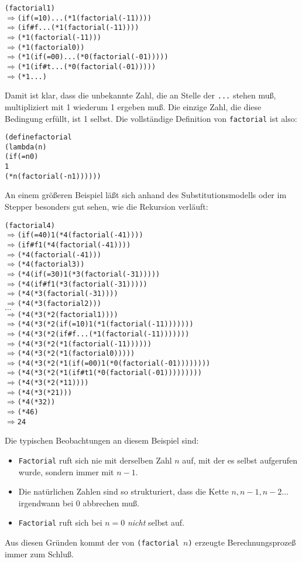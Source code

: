 \begin{alltt}
(factorial 1)
\(\Longrightarrow\) (if (= 1 0) ... (* 1 (factorial (- 1 1))))
\(\Longrightarrow\) (if #f ... (* 1 (factorial (- 1 1))))
\(\Longrightarrow\) (* 1 (factorial (- 1 1)))
\(\Longrightarrow\) (* 1 (factorial 0))
\(\Longrightarrow\) (* 1 (if (= 0 0) ... (* 0 (factorial (- 0 1)))))
\(\Longrightarrow\) (* 1 (if #t ... (* 0 (factorial (- 0 1)))))
\(\Longrightarrow\) (* 1 ...)
\end{alltt}
%
Damit ist klar, dass die unbekannte Zahl, die an Stelle der 
\texttt{...} stehen muß, multipliziert mit 1 wiederum 1 ergeben muß.
Die einzige Zahl, die diese Bedingung erfüllt, ist 1 selbst.  Die
vollständige Definition von \texttt{factorial} ist also:
%
\begin{alltt}
(define factorial
  (lambda (n)
    (if (= n 0)
        1
        (* n (factorial (- n 1))))))
\end{alltt}
%
An einem größeren Beispiel läßt sich anhand des Substitutionsmodells
oder im Stepper besonders gut sehen, wie die Rekursion verläuft:
%
\begin{alltt}
(factorial 4)
\(\Longrightarrow\) (if (= 4 0) 1 (* 4 (factorial (- 4 1))))
\(\Longrightarrow\) (if #f 1 (* 4 (factorial (- 4 1))))
\(\Longrightarrow\) (* 4 (factorial (- 4 1)))
\(\Longrightarrow\) (* 4 (factorial 3))
\(\Longrightarrow\) (* 4 (if (= 3 0) 1 (* 3 (factorial (- 3 1)))))
\(\Longrightarrow\) (* 4 (if #f 1 (* 3 (factorial (- 3 1)))))
\(\Longrightarrow\) (* 4 (* 3 (factorial (- 3 1))))
\(\Longrightarrow\) (* 4 (* 3 (factorial 2)))
\(\ldots\)
\(\Longrightarrow\) (* 4 (* 3 (* 2 (factorial 1))))
\(\Longrightarrow\) (* 4 (* 3 (* 2 (if (= 1 0) 1 (* 1 (factorial (- 1 1)))))))
\(\Longrightarrow\) (* 4 (* 3 (* 2 (if #f ... (* 1 (factorial (- 1 1)))))))
\(\Longrightarrow\) (* 4 (* 3 (* 2 (* 1 (factorial (- 1 1))))))
\(\Longrightarrow\) (* 4 (* 3 (* 2 (* 1 (factorial 0)))))
\(\Longrightarrow\) (* 4 (* 3 (* 2 (* 1 (if (= 0 0) 1 (* 0 (factorial (- 0 1))))))))
\(\Longrightarrow\) (* 4 (* 3 (* 2 (* 1 (if #t 1 (* 0 (factorial (- 0 1)))))))))
\(\Longrightarrow\) (* 4 (* 3 (* 2 (* 1 1))))
\(\Longrightarrow\) (* 4 (* 3 (* 2 1)))
\(\Longrightarrow\) (* 4 (* 3 2))
\(\Longrightarrow\) (* 4 6)
\(\Longrightarrow\) 24
\end{alltt}
%
Die typischen Beobachtungen an diesem Beispiel sind:
%
\begin{itemize}
\item \texttt{Factorial} ruft sich nie mit derselben Zahl $n$ auf, mit
  der es selbst aufgerufen wurde, sondern immer mit $n-1$.
\item Die natürlichen Zahlen sind so strukturiert, dass die Kette $n,
  n-1, n-2 \ldots$ irgendwann bei $0$ abbrechen muß.
\item \texttt{Factorial} ruft sich bei $n=0$ \emph{nicht}
  selbst auf.
\end{itemize}
%
Aus diesen Gründen kommt der von
\texttt{(factorial $n$)} erzeugte Berechnungsprozeß immer zum Schluß.  

